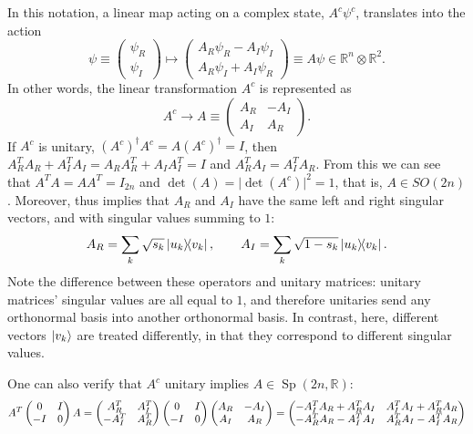 \documentclass[a4paper]{report}
\newcommand{\RR}{\mathbb{R}}
\newcommand{\on}[1]{\operatorname{#1}}
\begin{document}
In this notation, a linear map acting on a complex state, $A^c\psi^c$, translates into the action
\begin{equation}
	\psi\equiv \begin{pmatrix}
		\psi_R \\ \psi_I
	\end{pmatrix}
	\mapsto
	\begin{pmatrix}
		A_R \psi_R - A_I \psi_I \\
		A_R \psi_I + A_I \psi_R
	\end{pmatrix} \equiv A\psi \in \RR^n\otimes\RR^2.
\end{equation}
In other words, the linear transformation $A^c$ is represented as
\begin{equation}
	A^c \to A \equiv \begin{pmatrix}
		A_R & -A_I \\ A_I & A_R
	\end{pmatrix}.
\end{equation}
If $A^c$ is unitary, $(A^c)^\dagger A^c=A(A^c)^\dagger=I$, then $A_R^T A_R+A_I^T A_I = A_R A_R^T+A_I A_I^T = I$ and $A_R^T A_I = A_I^T A_R$.
From this we can see that $A^T A=AA^T=I_{2n}$ and $\det(A)=\lvert\det(A^c)\rvert^2=1$, that is, $A\in SO(2n)$.
Moreover, thus implies that $A_R$ and $A_I$ have the same left and right singular vectors, and with singular values summing to $1$:
\begin{equation}
	A_R = \sum_k \sqrt{s_k} \ketbra{u_k}{v_k},
	\qquad
	A_I = \sum_k \sqrt{1-s_k} \ketbra{u_k}{v_k}.
\end{equation}
Note the difference between these operators and unitary matrices: unitary matrices' singular values are all equal to $1$, and therefore unitaries send any orthonormal basis into another orthonormal basis. In contrast, here, different vectors $\ket{v_k}$ are treated differently, in that they correspond to different singular values.

One can also verify that $A^c$ unitary implies $A\in \on{Sp}(2n,\RR)$:
\begin{equation}\scalebox{0.9}{$\displaystyle
	A^T \begin{pmatrix}
		0 & I \\ -I & 0
	\end{pmatrix} A
	= \begin{pmatrix}
		A_R^T & A_I^T \\ -A_I^T & A_R^T
	\end{pmatrix}
	\begin{pmatrix}
		0 & I \\ -I & 0
	\end{pmatrix}
	\begin{pmatrix}
		A_R & -A_I \\ A_I & A_R
	\end{pmatrix} =
	\begin{pmatrix}
		-A_I^T A_R + A_R^T A_I & A_I^T A_I + A_R^T A_R \\
		-A_R^T A_R - A_I^T A_I & A_R^T A_I - A_I^T A_R
	\end{pmatrix}
$}\end{equation}
\end{document}
